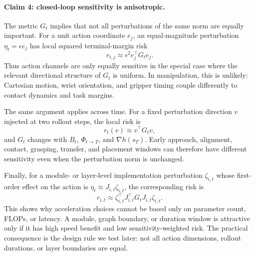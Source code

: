 \documentclass[10pt]{article}
\begin{document}
\paragraph{Claim 4: closed-loop sensitivity is anisotropic.}
The metric $G_t$ implies that not all perturbations of the same norm are equally important. For a unit action coordinate $e_j$, an equal-magnitude perturbation $\eta_t=\epsilon e_j$ has local squared terminal-margin risk
\begin{equation}
    r_{t,j}
    \approx
    \epsilon^2 e_j^\top G_t e_j .
    \label{eq:action-channel-risk}
\end{equation}
Thus action channels are only equally sensitive in the special case where the relevant directional structure of $G_t$ is uniform. In manipulation, this is unlikely: Cartesian motion, wrist orientation, and gripper timing couple differently to contact dynamics and task margins.

The same argument applies across time. For a fixed perturbation direction $v$ injected at two rollout steps, the local risk is
\begin{equation}
    r_t(v) \approx v^\top G_t v,
\end{equation}
and $G_t$ changes with $B_t$, $\Phi_{t\to T}$, and $\nabla h(s_T)$. Early approach, alignment, contact, grasping, transfer, and placement windows can therefore have different sensitivity even when the perturbation norm is unchanged.

Finally, for a module- or layer-level implementation perturbation $\zeta_{i,t}$ whose first-order effect on the action is $\eta_t\approx J_{i,t}\zeta_{i,t}$, the corresponding risk is
\begin{equation}
    r_{i,t}
    \approx
    \zeta_{i,t}^\top J_{i,t}^\top G_t J_{i,t}\zeta_{i,t}.
    \label{eq:module-risk}
\end{equation}
This shows why acceleration choices cannot be based only on parameter count, FLOPs, or latency. A module, graph boundary, or duration window is attractive only if it has high speed benefit and low sensitivity-weighted risk. The practical consequence is the design rule we test later: not all action dimensions, rollout durations, or layer boundaries are equal.
\end{document}
